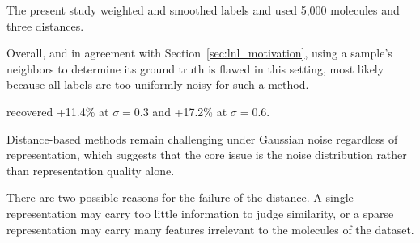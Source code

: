 The present study weighted and smoothed labels and used 5,000 molecules and three distances.

Overall, and in agreement with Section~\ref{sec:lnl_motivation}, using a sample's neighbors to determine its ground truth is flawed in this setting, most likely because all labels are too uniformly noisy for such a method.

recovered +11.4\% at $\sigma = 0.3$ and +17.2\% at $\sigma = 0.6$.

Distance-based methods remain challenging under Gaussian noise regardless of representation, which suggests that the core issue is the noise distribution rather than representation quality alone.

There are two possible reasons for the failure of the distance. A single representation may carry too little information to judge similarity, or a sparse representation may carry many features irrelevant to the molecules of the dataset.

